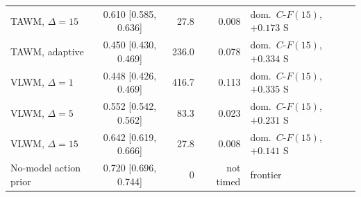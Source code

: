{\begin{revblock}
\begin{longtable}{@{}lcrrl@{}}
TAWM, $\Delta=15$ & 0.610 [0.585, 0.636] & 27.8 & 0.008 & dom.\ $C\text{-}F(15)$, $+0.173$ S \\
TAWM, adaptive & 0.450 [0.430, 0.469] & 236.0 & 0.078 & dom.\ $C\text{-}F(15)$, $+0.334$ S \\
VLWM, $\Delta=1$ & 0.448 [0.426, 0.469] & 416.7 & 0.113 & dom.\ $C\text{-}F(15)$, $+0.335$ S \\
VLWM, $\Delta=5$ & 0.552 [0.542, 0.562] & 83.3 & 0.023 & dom.\ $C\text{-}F(15)$, $+0.231$ S \\
VLWM, $\Delta=15$ & 0.642 [0.619, 0.666] & 27.8 & 0.008 & dom.\ $C\text{-}F(15)$, $+0.141$ S \\
No-model action prior & 0.720 [0.696, 0.744] & 0 & not timed & frontier \\
\end{longtable}
\end{revblock}
}

